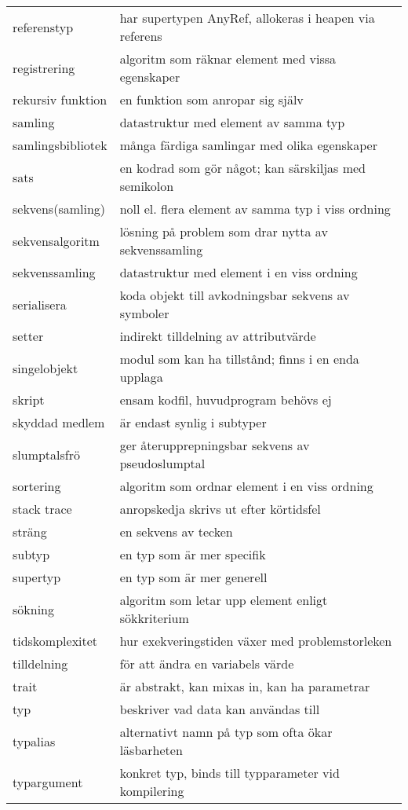 \begin{tabular}{l|l}
referenstyp & har supertypen AnyRef, allokeras i heapen via referens \\
registrering & algoritm som räknar element med vissa egenskaper \\
rekursiv funktion & en funktion som anropar sig själv \\
samling & datastruktur med element av samma typ \\
samlingsbibliotek & många färdiga samlingar med olika egenskaper \\
sats & en kodrad som gör något; kan särskiljas med semikolon \\
sekvens(samling) & noll el. flera element av samma typ i viss ordning \\
sekvensalgoritm & lösning på problem som drar nytta av sekvenssamling \\
sekvenssamling & datastruktur med element i en viss ordning \\
serialisera & koda objekt till avkodningsbar sekvens av symboler \\
setter & indirekt tilldelning av attributvärde \\
singelobjekt & modul som kan ha tillstånd; finns i en enda upplaga \\
skript & ensam kodfil, huvudprogram behövs ej \\
skyddad medlem & är endast synlig i subtyper \\
slumptalsfrö & ger återupprepningsbar sekvens av pseudoslumptal \\
sortering & algoritm som ordnar element i en viss ordning \\
stack trace & anropskedja skrivs ut efter körtidsfel \\
sträng & en sekvens av tecken \\
subtyp & en typ som är mer specifik \\
supertyp & en typ som är mer generell \\
sökning & algoritm som letar upp element enligt sökkriterium \\
tidskomplexitet & hur exekveringstiden växer med problemstorleken \\
tilldelning & för att ändra en variabels värde \\
trait & är abstrakt, kan mixas in, kan ha parametrar \\
typ & beskriver vad data kan användas till \\
typalias & alternativt namn på typ som ofta ökar läsbarheten \\
typargument & konkret typ, binds till typparameter vid kompilering \\

\end{tabular}
